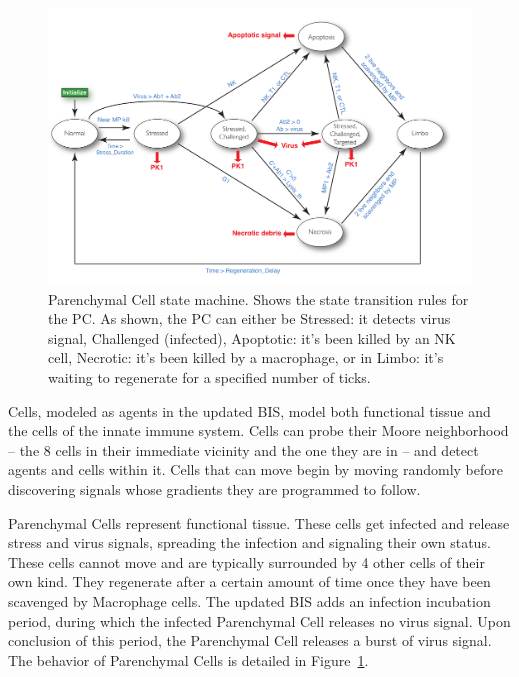 \documentclass[10pt,conference]{IEEEtran}
\begin{document}
\begin{figure}[h]
\centering
\captionsetup{justification=centering,width=7.0in}
\includegraphics[width=7in]{PC_fsm}
\caption{Parenchymal Cell state machine. Shows the state transition rules for the PC. As shown, the PC can either be Stressed: it detects
virus signal, Challenged (infected), Apoptotic: it's been killed by an NK cell, Necrotic: it's been killed by a macrophage, or in Limbo: it's waiting
to regenerate for a specified number of ticks.}
\label{PC_fsm}
\end{figure}

Cells, modeled as agents in the updated BIS, model both functional tissue and the cells of the innate immune system. Cells can probe their
Moore neighborhood -- the 8 cells in their immediate vicinity and the one they are in -- and detect agents and cells within it. Cells that can
move begin by moving randomly before discovering signals whose gradients they are programmed to follow.

\indent
Parenchymal Cells represent functional tissue. These cells get infected and release stress and virus signals, spreading the infection and
signaling their own status. These cells cannot move and are typically surrounded by 4 other cells of their own kind. They regenerate after a
certain amount of time once they have been scavenged by Macrophage cells. The updated BIS adds an infection incubation period, during
which the infected Parenchymal Cell releases no virus signal. Upon conclusion of this period, the Parenchymal Cell releases a burst of virus
signal. The behavior of Parenchymal Cells is detailed in Figure~\ref{PC_fsm}.
\end{document}
